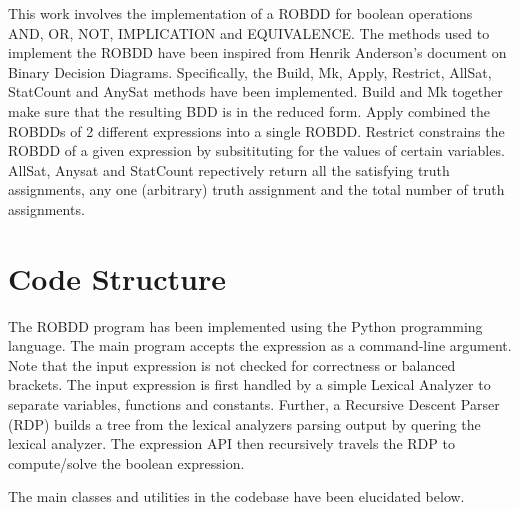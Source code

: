 \documentclass[a4paper, titlepage, 12pt]{article}
\numberwithin{equation}{section}
\begin{document}
        This work involves the implementation of a ROBDD for boolean operations AND, OR, NOT, IMPLICATION and EQUIVALENCE.
        The methods used to implement the ROBDD have been inspired from Henrik Anderson's document on Binary Decision Diagrams.
        Specifically, the Build, Mk, Apply, Restrict, AllSat, StatCount and AnySat methods have been implemented.
        Build and Mk together make sure that the resulting BDD is in the reduced form.
        Apply combined the ROBDDs of 2 different expressions into a single ROBDD.
        Restrict constrains the ROBDD of a given expression by subsitituting for the values of certain variables.
        AllSat, Anysat and StatCount repectively return all the satisfying truth assignments, any one (arbitrary) truth assignment and the total number of truth assignments.
         
    \section{Code Structure}

        The ROBDD program has been implemented using the Python programming language.
        The main program accepts the expression as a command-line argument.
        Note that the input expression is not checked for correctness or balanced brackets.
        The input expression is first handled by a simple Lexical Analyzer to separate variables, functions and constants.
        Further, a Recursive Descent Parser (RDP) builds a tree from the lexical analyzers parsing output by quering the lexical analyzer.
        The expression API then recursively travels the RDP to compute/solve the boolean expression.
        
        The main classes and utilities in the codebase have been elucidated below.
        
\end{document}
